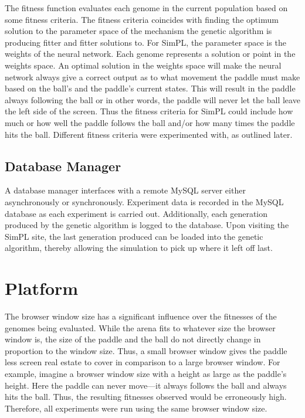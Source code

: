 The fitness function evaluates each genome in the current population based on some fitness criteria. The fitness criteria coincides with finding the optimum solution to the parameter space of the mechanism the genetic algorithm is producing fitter and fitter solutions to. For SimPL, the parameter space is the weights of the neural network. Each genome represents a solution or point in the weights space. An optimal solution in the weights space will make the neural network always give a correct output as to what movement the paddle must make based on the ball's and the paddle's current states. This will result in the paddle always following the ball or in other words, the paddle will never let the ball leave the left side of the screen. Thus the fitness criteria for SimPL could include how much or how well the paddle follows the ball and/or how many times the paddle hits the ball. Different fitness criteria were experimented with, as outlined later. 


\subsection{Database Manager}

A database manager interfaces with a remote MySQL server either asynchronously or synchronously. Experiment data is recorded in the MySQL database as each experiment is carried out. Additionally, each generation produced by the genetic algorithm is logged to the database. Upon visiting the SimPL site, the last generation produced can be loaded into the genetic algorithm, thereby allowing the simulation to pick up where it left off last.  

\section{Platform}

The browser window size has a significant influence over the fitnesses of the genomes being evaluated. While the arena fits to whatever size the browser window is, the size of the paddle and the ball do not directly change in proportion to the window size. Thus, a small browser window gives the paddle less screen real estate to cover in comparison to a large browser window. For example, imagine a browser window size with a height as large as the paddle's height. Here the paddle can never move---it always follows the ball and always hits the ball. Thus, the resulting fitnesses observed would be erroneously high. Therefore, all experiments were run using the same browser window size. 

